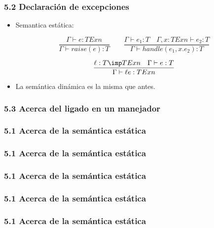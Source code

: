 \documentclass[xcolor=dvipsnames,table,spanish]{beamer}
\begin{document}
\begin{frame}
\frametitle{5.2 Declaración de excepciones}
\begin{itemize}
\item Semantica estática:

\[ \frac{\Gamma \vdash e:TExn}{\Gamma \vdash raise(e):T} \qquad \frac{\Gamma \vdash e_1:T \quad \Gamma,x:TExn \vdash e_2:T}{\Gamma \vdash handle(e_1,x.e_2):T}\]

\[ \frac{\ell:T \imp TExn \quad \Gamma \vdash e:T}{\Gamma \vdash \ell e:TExn}\]
\item La semántica dinámica es la misma que antes.
\end{itemize}
\end{frame}
\begin{frame}
\frametitle{5.3 Acerca del ligado en un manejador}

\end{frame}

\begin{frame}
\frametitle{5.1 Acerca de la semántica estática}

\end{frame}
\begin{frame}
\frametitle{5.1 Acerca de la semántica estática}

\end{frame}
\begin{frame}
\frametitle{5.1 Acerca de la semántica estática}

\end{frame}
\begin{frame}
\frametitle{5.1 Acerca de la semántica estática}

\end{frame}
\begin{frame}
\frametitle{5.1 Acerca de la semántica estática}

\end{frame}
\end{document}
